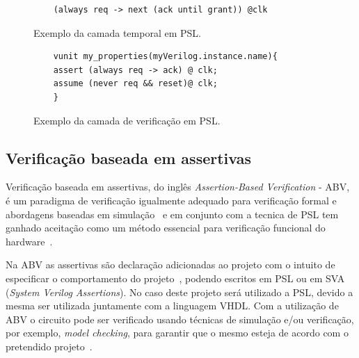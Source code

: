 \begin{figure}[H]
\caption{\label{fig:psl_example2} Exemplo da camada temporal em PSL.}
	\begin{center}
    \begin{minipage}{0.7\textwidth}
    \begin{lstlisting}       
    (always req -> next (ack until grant)) @clk
    \end{lstlisting}
    \end{minipage}
	\end{center}
\end{figure}

\begin{figure}[H]
\caption{\label{fig:psl_example3} Exemplo da camada de verificação em PSL.}
	\begin{center}
    \begin{minipage}{0.7\textwidth}
    \begin{lstlisting}       
    vunit my_properties(myVerilog.instance.name){
    assert (always req -> ack) @ clk;
    assume (never req && reset)@ clk;
    }
    \end{lstlisting}
    \end{minipage}
	\end{center}
\end{figure}


\subsection{Verificação baseada em assertivas}

Verificação baseada em assertivas, do inglês \textit{Assertion-Based Verification} - ABV, é um paradigma de verificação igualmente adequado para verificação formal e abordagens baseadas em simulação~\cite{boule2005incorporating} e em conjunto com a tecnica de PSL tem ganhado aceitação como um método essencial para verificação funcional do hardware~\cite{DahanCombining}.

\par
Na ABV as assertivas são declaração adicionadas ao projeto com o intuito de especificar o comportamento do projeto~\cite{boule2005incorporating}, podendo escritos em PSL ou em SVA (\textit{System Verilog Assertions}). No caso deste projeto será utilizado a PSL, devido a mesma ser utilizada juntamente com a linguagem VHDL. Com a utilização de ABV o circuito pode ser verificado usando técnicas de simulação e/ou verificação, por exemplo, \textit{model checking}, para garantir que o mesmo esteja de acordo com o pretendido projeto~\cite{DahanCombining}.

